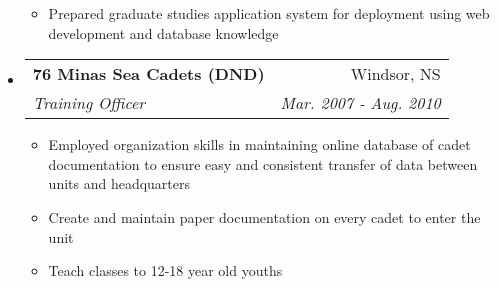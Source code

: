 \documentclass[letterpaper,11pt]{article}
\makeatletter
\newcommand{\resitem}[1]{\item #1 \vspace{-2pt}}
\newcommand{\ressubheading}[4]{
\begin{tabular*}{6.5in}{l@{\extracolsep{\fill}}r}
        \textbf{#1} & #2 \\
        \textit{#3} & \textit{#4} \\
\end{tabular*}\vspace{-6pt}}
\makeatother
\begin{document}
\begin{itemize}
\begin{itemize}
                    \resitem{Prepared graduate studies application system for deployment using web development and database knowledge}
                \end{itemize}
        \item[]
            \ressubheading{76 Minas Sea Cadets (DND)}{Windsor, NS}{Training Officer}{Mar. 2007 - Aug. 2010}
                \begin{itemize}
                    \resitem{Employed organization skills in maintaining online database of cadet documentation to ensure easy and consistent transfer of data
                    between units and headquarters}
                    \resitem{Create and maintain paper documentation on every cadet to enter the unit}
                    \resitem{Teach classes to 12-18 year old youths}
                \end{itemize}
\begin{comment}
        \item[]
            \ressubheading{HMCS Acadia (DND)}{Cornwallis NS}{Boatswain Divisional Officer}{July - Aug. 2007-2009}
                \begin{itemize}
                    \resitem{Solely responsible for 25 cadets, ages 13-18 from 6:00am to 8:00pm}
                    \resitem{Documented training and performance in corps life in thorough reports for each individual cadet}
                    \resitem{Disciplined cadets to appropriate levels when required}
                    \resitem{Effectively communicated information within classes}
                    \resitem{Developed leadership skills of cadets}
                \end{itemize}
\end{comment}
    \end{itemize}  %
\end{document}

